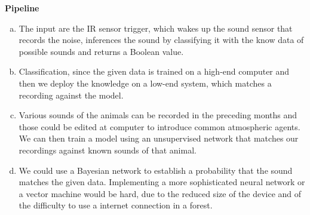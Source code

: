 \documentclass[a4paper, 12pt]{article}
\begin{document}
\begin{exercise}
\textbf{Pipeline}
\begin{enumerate}[(a)]
    \item The input are the IR sensor trigger, which wakes up the sound sensor
		that records the noise, inferences the sound by classifying it with 
		the know data of possible sounds and
		returns a Boolean value.
	\item Classification, since the given data is trained on a high-end
		computer and then we deploy the knowledge on a low-end system, which
		matches a recording against the model. 
	\item Various sounds of the animals can be recorded in the preceding months
		and those could be edited at computer to introduce common atmospheric
		agents. We can then train a model using an unsupervised network that
		matches our recordings against known sounds of that animal. 
	\item We could use a Bayesian network to establish a probability that the
		sound matches the given data. Implementing a more sophisticated neural
		network or a vector machine would be hard, due to the reduced size of
		the device and of the difficulty to use a internet connection in a
		forest.
\end{enumerate}


\end{exercise}
\end{document}
